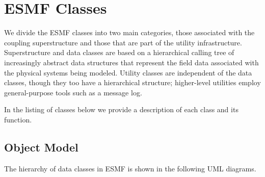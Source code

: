 \section{ESMF Classes}

We divide the ESMF classes into two main categories, those associated with the coupling 
superstructure and those that are part of the utility infrastructure.  Superstructure and data 
classes are based on a hierarchical 
calling tree of increasingly abstract data structures that represent the field data associated 
with the physical systems being modeled.  Utility classes are independent 
of the data classes, though they too have a hierarchical structure; higher-level utilities
employ general-purpose tools such as a message log.

In the listing of classes below we provide a description of each class and its function.

\subsection{Object Model}

The hierarchy of data classes in ESMF is shown in the following UML diagrams.  


